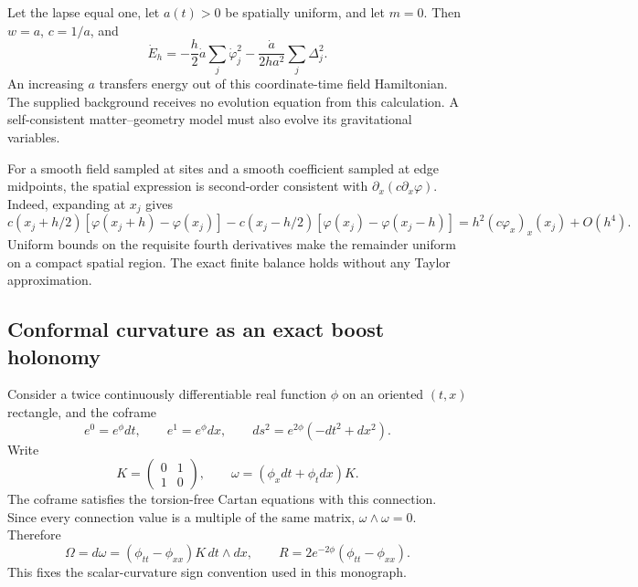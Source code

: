 \begin{example}
Let the lapse equal one, let $a(t)>0$ be spatially uniform, and let $m=0$.
Then $w=a$, $c=1/a$, and
\[
 \dot E_h=-\frac h2\dot a\sum_j\dot\varphi_j^2
 -\frac{\dot a}{2ha^2}\sum_j\Delta_j^2.
\]
An increasing $a$ transfers energy out of this coordinate-time field
Hamiltonian. The supplied background receives no evolution equation
from this calculation. A self-consistent matter--geometry model must
also evolve its gravitational variables.
\end{example}

For a smooth field sampled at sites and a smooth coefficient sampled at
edge midpoints, the spatial expression is second-order consistent with
$\partial_x(c\partial_x\varphi)$. Indeed, expanding at $x_j$ gives
\[
 c(x_j+h/2)[\varphi(x_j+h)-\varphi(x_j)]
 -c(x_j-h/2)[\varphi(x_j)-\varphi(x_j-h)]
 =h^2(c\varphi_x)_x(x_j)+O(h^4).
\]
Uniform bounds on the requisite fourth derivatives make the remainder
uniform on a compact spatial region. The exact finite balance holds
without any Taylor approximation.

\FloatBarrier



\subsection{Conformal curvature as an exact boost holonomy}

Consider a twice continuously differentiable real function $\phi$ on an
oriented $(t,x)$ rectangle, and the coframe
\[
 e^0=e^\phi dt,\qquad e^1=e^\phi dx,
 \qquad ds^2=e^{2\phi}(-dt^2+dx^2).
\]
Write
\[
 K=\begin{pmatrix}0&1\\1&0\end{pmatrix},\qquad
 \omega=(\phi_xdt+\phi_tdx)K.
\]
The coframe satisfies the torsion-free Cartan equations with this
connection. Since every connection value is a multiple of the same
matrix, $\omega\wedge\omega=0$. Therefore
\begin{equation}
 \Omega=d\omega=(\phi_{tt}-\phi_{xx})K\,dt\wedge dx,
 \qquad R=2e^{-2\phi}(\phi_{tt}-\phi_{xx}).
 \label{c:core:conformal-curvature}
\end{equation}
This fixes the scalar-curvature sign convention used in this monograph.

